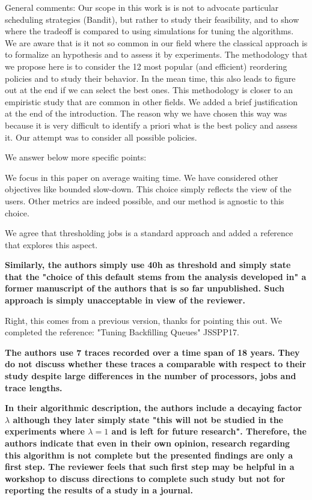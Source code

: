 \documentclass[]{article}
\begin{document}
General comments: Our scope in this work is is not to advocate particular scheduling strategies (Bandit), but rather to study their feasibility, 
and to show where the tradeoff is compared to using simulations for tuning the algorithms. 
We are aware that is it not so common in our field where the classical approach is to formalize an hypothesis and to assess it by experiments. 
The methodology that we propose here is to consider the 12 most popular (and efficient) reordering policies and to study their behavior.
In the mean time, this also leads to figure out at the end if we can select the best ones.
This methodology is closer to an empiristic study that are common in other fields.
We added a brief justification at the end of the introduction.
The reason why we have chosen this way was because it is very difficult to identify a priori what is the best policy and assess it. 
Our attempt was to consider all possible policies. 
\medskip

We answer below more specific points:

We focus in this paper on average waiting time. We have considered other objectives like bounded slow-down.
This choice simply reflects the view of the users. Other metrics are indeed possible,
and our method is agnostic to this choice. 

We agree that thresholding jobs is a standard approach and added a reference 
that explores this aspect.


\textbf{Similarly, the authors simply use 40h as threshold and simply state
that the "choice of this default stems from the analysis developed in" a former
manuscript of the authors that is so far unpublished. Such approach is simply
unacceptable in view of the reviewer.}

Right, this comes from a previous version, thanks for pointing this out. 
We completed the reference: "Tuning Backfilling Queues" JSSPP17.
\medskip

\textbf{The authors use 7 traces recorded over a time span of 18 years. They do
not discuss whether these traces a comparable with respect to their study
despite large differences in the number of processors, jobs and trace lengths.}

\textbf{In their algorithmic description, the authors include a decaying factor
$\lambda$ although they later simply state "this will not be studied in the
experiments where $\lambda=1$ and is left for future research". Therefore, the
authors indicate that even in their own opinion, research regarding this
algorithm is not complete but the presented findings are only a first step. The
reviewer feels that such first step may be helpful in a workshop to discuss
directions to complete such study but not for reporting the results of a study
in a journal. }
\end{document}
